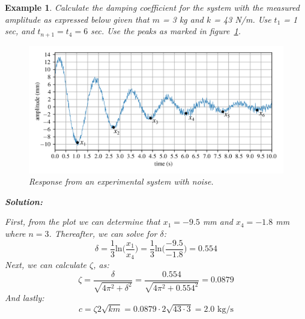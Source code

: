 \documentclass[12pt,letter]{article}
\newtheorem{ex}{Example}
\numberwithin{ex}{section} %
\newenvironment{example}{\begin{mdframed}[middlelinewidth=0.5mm]\begin{ex}\normalfont}{\end{ex}\end{mdframed}}
\numberwithin{re}{section} %
\numberwithin{equation}{section}	%
\begin{document}
\begin{example}
			
			Calculate the damping coefficient for the system with the measured amplitude as expressed below given that $m$ = 3 kg and $k$ = 43 N/m. Use $t_1$ = 1 sec, and $t_{n+1} =t_4=6$ sec. Use the peaks as marked in figure~\ref{fig:Logarithmic_decrement_with_noise}.

			\begin{figure}[H]
				\centering
				\includegraphics[width=1\linewidth]{../figures/Logarithmic_decrement_with_noise.png}
				\caption{Response from an experimental system with noise.}
				\label{fig:Logarithmic_decrement_with_noise}
			\end{figure}
			
			\noindent\textbf{Solution:} 
						
			First, from the plot we can determine that $x_1=-9.5$ mm and $x_4=-1.8$ mm where $n=3$. Thereafter, we can solve for $\delta$:  
			\begin{equation}
				\delta = \frac{1}{3}\text{ln}\bigg(\frac{x_{\text{1}}}{x_{\text{4}}}\bigg) = \frac{1}{3}\text{ln}\bigg(\frac{-9.5}{-1.8}\bigg) = 0.554
			\end{equation}						
			Next, we can calculate $\zeta$, as: 
			\begin{equation}
				\zeta = \frac{\delta}{\sqrt{4\pi^2+\delta^2}} = \frac{0.554}{\sqrt{4\pi^2+0.554^2}} = 0.0879
			\end{equation}
			And lastly:			
			\begin{equation}
				c = \zeta 2\sqrt{km} = 0.0879 \cdot 2\sqrt{43 \cdot 3} = 2.0 \text{ kg/s}
			\end{equation}	

\end{example}
\end{document}
